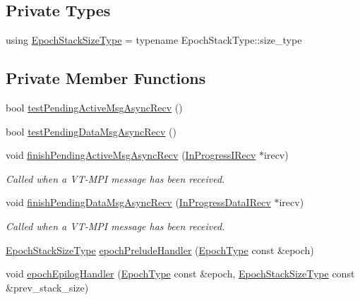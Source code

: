 \subsection*{Private Types}
\begin{DoxyCompactItemize}
\item 
using \hyperlink{structvt_1_1messaging_1_1_active_messenger_a447c6c0b3387142fd14b26c12e3ed877}{Epoch\+Stack\+Size\+Type} = typename Epoch\+Stack\+Type\+::size\+\_\+type
\end{DoxyCompactItemize}
\subsection*{Private Member Functions}
\begin{DoxyCompactItemize}
\item 
bool \hyperlink{structvt_1_1messaging_1_1_active_messenger_a12133fda914a7809ac7ce7694efc312e}{test\+Pending\+Active\+Msg\+Async\+Recv} ()
\item 
bool \hyperlink{structvt_1_1messaging_1_1_active_messenger_ae8e94c46cd2948864a97a671428b64bc}{test\+Pending\+Data\+Msg\+Async\+Recv} ()
\item 
void \hyperlink{structvt_1_1messaging_1_1_active_messenger_a162667e5566546402f12baf8cf60d4da}{finish\+Pending\+Active\+Msg\+Async\+Recv} (\hyperlink{structvt_1_1messaging_1_1_in_progress_i_recv}{In\+Progress\+I\+Recv} $\ast$irecv)
\begin{DoxyCompactList}\small\item\em Called when a V\+T-\/\+M\+PI message has been received. \end{DoxyCompactList}\item 
void \hyperlink{structvt_1_1messaging_1_1_active_messenger_a80a13017308870133ff8538741bee394}{finish\+Pending\+Data\+Msg\+Async\+Recv} (\hyperlink{structvt_1_1messaging_1_1_in_progress_data_i_recv}{In\+Progress\+Data\+I\+Recv} $\ast$irecv)
\begin{DoxyCompactList}\small\item\em Called when a V\+T-\/\+M\+PI message has been received. \end{DoxyCompactList}\item 
\hyperlink{structvt_1_1messaging_1_1_active_messenger_a447c6c0b3387142fd14b26c12e3ed877}{Epoch\+Stack\+Size\+Type} \hyperlink{structvt_1_1messaging_1_1_active_messenger_a8209c23bddf111089f4fd64d7cd2f67e}{epoch\+Prelude\+Handler} (\hyperlink{namespacevt_a985a5adf291c34a3ca263b3378388236}{Epoch\+Type} const \&epoch)
\item 
void \hyperlink{structvt_1_1messaging_1_1_active_messenger_a6418078d6eba01bfd36e46d54c076713}{epoch\+Epilog\+Handler} (\hyperlink{namespacevt_a985a5adf291c34a3ca263b3378388236}{Epoch\+Type} const \&epoch, \hyperlink{structvt_1_1messaging_1_1_active_messenger_a447c6c0b3387142fd14b26c12e3ed877}{Epoch\+Stack\+Size\+Type} const \&prev\+\_\+stack\+\_\+size)
\end{DoxyCompactItemize}
